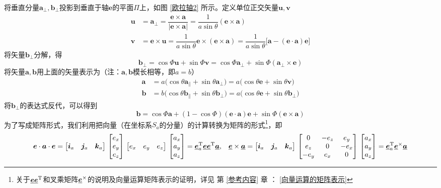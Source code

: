 将垂直分量$\bm{a}_{\perp}, \bm{b}_{\perp}$投影到垂直于轴$\bm{e}$的平面$\Pi$上，如图 \ref{欧拉轴2} 所示。定义单位正交矢量$\bm{u}, \bm{v}$
\begin{align*}
	\bm{u} & = \bm{a}_{\perp} = \dfrac{\bm{e} \times \bm{a}}{\big| \bm{e} \times \bm{a} \big|} = \dfrac{1}{a \sin \theta}(\bm{e} \times \bm{a}) \\
	\bm{v} & = \bm{e} \times \bm{u} = \dfrac{1}{a \sin \theta} \bm{e} \times (\bm{e} \times \bm{a})= \dfrac{1}{a \sin \theta}\big[ \bm{a} - (\bm{e} \cdot \bm{a})\bm{e} \big] 
\end{align*}
将矢量$\bm{b}_{\perp}$分解，得
\begin{equation*}
	\bm{b}_{\perp} = \cos \varPhi \bm{u} + \sin \varPhi \bm{v} = \cos \varPhi \bm{a}_\perp + \sin \varPhi (\bm{a}_\perp \times \bm{e})
\end{equation*}
将矢量$\bm{a}, \bm{b}$用上面的矢量表示为（注：$\bm{a}, \bm{b}$模长相等，即$a=b$）
\begin{align}
	\bm{a} & = a \big( \cos \theta \bm{a}_{\parallel} + \sin \theta \bm{a}_{\perp} \big) 
	= a \big( \cos \theta \bm{e} + \sin \theta \bm{v} \big) \\
	\bm{b} & = b \big( \cos \theta \bm{b}_{\parallel} + \sin \theta \bm{b}_{\perp} \big) 
	= a \big( \cos \theta \bm{e} + \sin \theta \bm{b}_{\perp} \big)
\end{align}
将$\bm{b}_{\perp}$的表达式反代，可以得到
\begin{equation}
	\bm{b} = \cos \varPhi \bm{a} + ( 1 - \cos \varPhi ) (\bm{e} \cdot \bm{a})\bm{e} + \sin \varPhi(\bm{e} \times \bm{a})
\end{equation}
为了写成矩阵形式，我们利用把向量（在坐标系$S_a$的分量）的计算转换为矩阵的形式\footnote[1]{关于$\underline{\bm{e}}\underline{\bm{e}}^{\text{T}}$和叉乘矩阵$\underline{\bm{e}}^\times$的说明及向量运算矩阵表示的证明，详见 第 \ref{参考内容} 章 \link[参考内容]： \ref{向量运算的矩阵表示} \link[向量运算的矩阵表示]}，即
\begin{align*}
	\bm{e} \cdot \bm{a} \cdot \bm{e} = 
	\big[ \bm{i}_a \quad \bm{j}_a \quad \bm{k}_a \big] \,
	\begin{bmatrix}
		e_x \\
		e_y \\
		e_z
	\end{bmatrix}
	\,
	\big[ e_x \quad e_y \quad e_z \big]
	\,
	\begin{bmatrix}
		a_x \\
		a_y \\
		a_z
	\end{bmatrix}
	= \underline{\bm{e}}_a^{\text{T}} \underline{\bm{e}} \underline{\bm{e}}^\text{T} \underline{\bm{a}},
	&& \underline{\bm{e}} \times \underline{\bm{a}} =
	\big[ \bm{i}_a \quad \bm{j}_a \quad \bm{k}_a \big] \,
	\begin{bmatrix}
		0 & -e_z & e_y \\
		e_z & 0 & -e_x \\
		-e_y & e_x & 0
	\end{bmatrix}
	\,
	\begin{bmatrix}
		a_x \\
		a_y \\
		a_z
	\end{bmatrix}
	= \underline{\bm{e}}_a^{\text{T}} \underline{\bm{e}}^\times \underline{\bm{a}}
\end{align*}

